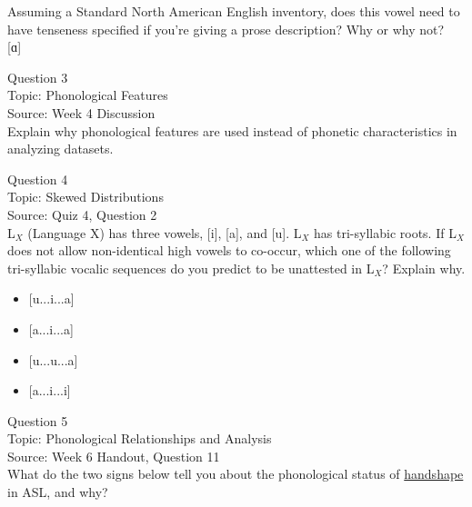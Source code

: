 \documentclass[12pt]{article}
\begin{document}
Assuming a Standard North American English inventory, does this vowel need to have tenseness specified if you're giving a prose description? Why or why not?\\

{[ɑ]}


\newpage

{\large Question 3}\\

Topic: Phonological Features\\
Source: Week 4 Discussion\\

Explain why phonological features are used instead of phonetic characteristics in analyzing datasets.\\


\newpage

{\large Question 4}\\

Topic: Skewed Distributions\\
Source: Quiz 4, Question 2\\

L$_X$ (Language X) has three vowels, [i], [a], and [u]. L$_X$ has tri-syllabic roots. If L$_X$ does not allow non-identical high vowels to co-occur, which one of the following tri-syllabic vocalic sequences do you predict to be unattested in L$_X$? Explain why.\\

\begin{itemize} \item {[u...i...a]} \item {[a...i...a]} \item {[u...u...a]} \item {[a...i...i]} \end{itemize}


\newpage

{\large Question 5}\\

Topic: Phonological Relationships and Analysis\\
Source: Week 6 Handout, Question 11\\

What do the two signs below tell you about the phonological status of \underline{handshape} in ASL, and why?\\
\end{document}
